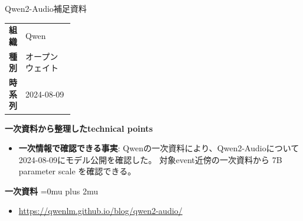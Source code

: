 \begin{technicalnote}{Qwen2-Audio}{補足資料}
\begingroup
\begin{tabularx}{\linewidth}{@{}>{\bfseries}p{0.22\linewidth}X@{}}
組織 & Qwen \\
種別 & オープンウェイト \\
時系列 & 2024-08-09 \\
\end{tabularx}
\smallskip
{\bfseries 一次資料から整理したtechnical points}
\begin{itemize}[leftmargin=1.5em,itemsep=0.35em]
\item \textbf{一次情報で確認できる事実}: Qwenの一次資料により、Qwen2-Audioについて2024-08-09にモデル公開を確認した。 対象event近傍の一次資料から 7B parameter scale を確認できる。
\end{itemize}
\begin{minipage}{\linewidth}
\begin{samepage}
{\bfseries 一次資料}
\begingroup\sloppy
\Urlmuskip=0mu plus 2mu\relax
\begin{itemize}[leftmargin=1.5em,itemsep=0.25em]
\item {\scriptsize\url{https://qwenlm.github.io/blog/qwen2-audio/}}
\end{itemize}
\endgroup
\end{samepage}
\end{minipage}
\endgroup
\end{technicalnote}
\medskip

